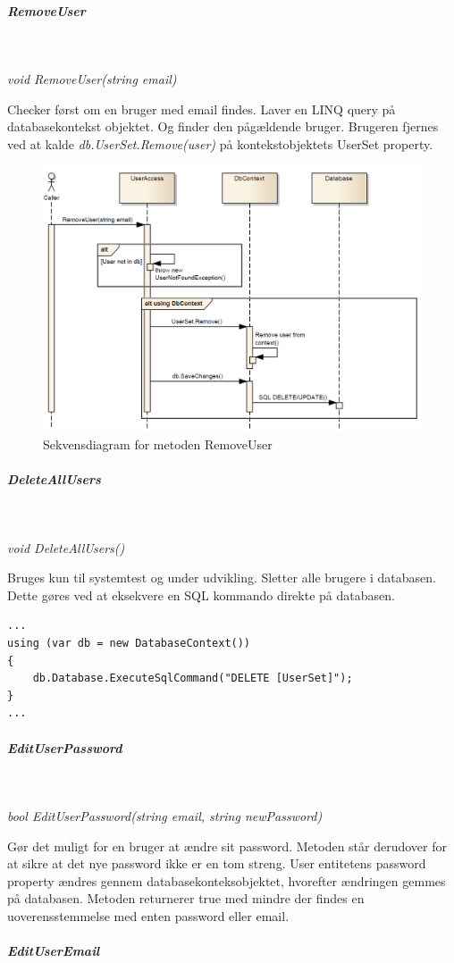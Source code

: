 \subparagraph{RemoveUser}\

\textit{void RemoveUser(string email)}

Checker først om en bruger med email findes.
Laver en LINQ query på databasekontekst objektet. Og finder den pågældende bruger.
Brugeren fjernes ved at kalde \textit{db.UserSet.Remove(user)} på kontekstobjektets UserSet property.

\begin{figure}[h]
\centering
\includegraphics[width=0.7\linewidth]{figs/dbSeq/removeUser.PNG}
\caption{Sekvensdiagram for metoden RemoveUser}
\label{fig:removeUser}
\end{figure}


\subparagraph{DeleteAllUsers}\

\textit{void DeleteAllUsers()}

Bruges kun til systemtest og under udvikling.
Sletter alle brugere i databasen. Dette gøres ved at eksekvere en SQL kommando direkte på databasen. 

\begin{lstlisting}[caption=SQL injection på databasen ved sletning af brugere, label=sqlDeleteUsers]
...
using (var db = new DatabaseContext())
{
	db.Database.ExecuteSqlCommand("DELETE [UserSet]");
}
...	
\end{lstlisting}

\subparagraph{EditUserPassword}\

\textit{bool EditUserPassword(string email, string newPassword)}

Gør det muligt for en bruger at ændre sit password. Metoden står derudover for at sikre at det nye password ikke er en tom streng. User entitetens password property ændres gennem databasekonteksobjektet, hvorefter ændringen gemmes på databasen.
Metoden returnerer true med mindre der findes en uoverensstemmelse med enten password eller email.

\subparagraph{EditUserEmail}\

